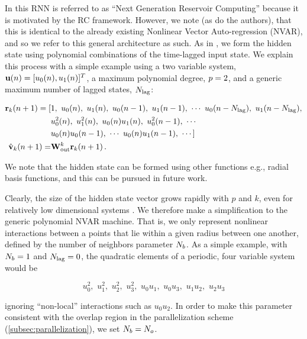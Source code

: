 In \citet{gauthier_next_2021} this RNN is referred to as ``Next Generation
Reservoir Computing'' because it is motivated by the RC framework.
However, we note (as do the authors), that this is identical to the already
existing Nonlinear Vector Auto-regression (NVAR), and so we refer to this general architecture as
such.
As in \citet{gauthier_next_2021,chen_next_2022}, we form the hidden state using
polynomial combinations of the time-lagged input state.
We explain this process with a simple example using a two variable system,
$\mathbf{u}(n) = [u_0(n), u_1(n)]^T$,
a maximum polynomial degree,
$p=2$, and a generic maximum number of lagged states, $N_\text{lag}$:
\begin{linenomath*}\begin{equation}
    \begin{aligned}
        \mathbf{r}_{k}(n+1)
        =
        [&1, \,\,
        u_0(n), \,\, u_1(n), \,\,
        u_0(n-1),\,\, u_1(n-1), \,\,
        \cdots \,\,
        u_0(n-N_\text{lag}), \,\, u_1(n-N_\text{lag}), \\
         &u_0^2(n), \,\, u_1^2(n), \,\, u_0(n)u_1(n), \,\,
        u_0^2(n-1), \,\, \cdots \\
         &u_0(n)u_0(n-1), \,\, \cdots \,\,
        u_0(n)u_1(n-1), \,\, \cdots
        ] \\
        \hat{\mathbf{v}}_{k}(n+1) = &\mathbf{W}_\text{out}^{k} \mathbf{r}_{k}(n+1) \, .
    \end{aligned}
\end{equation}\end{linenomath*}
We note that the hidden state can be formed using other functions e.g., radial
basis functions, and this can be pursued in future work.

Clearly, the size of the hidden state vector grows rapidly with $p$ and $k$,
even for relatively low dimensional systems
\citep<see supplemental material of>[for details]{chen_next_2022}.
We therefore make a simplification to the generic polynomial NVAR machine.
That is, we only represent nonlinear interactions between a points that lie
within a given radius between one another, defined by the number of neighbors parameter $N_{b}$.
As a simple example, with $N_{b}=1$ and $N_\text{lag}=0$, the quadratic elements of a periodic, four variable
system would be
\begin{linenomath*}\begin{equation*}
    u_0^2, \,\, u_1^2, \,\, u_2^2, \,\, u_3^2, \,\,
    u_0u_1, \,\, u_0u_3, \,\, u_1u_2, \,\, u_2u_3
\end{equation*}\end{linenomath*}
ignoring ``non-local'' interactions such as $u_0u_2$.
In order to make this parameter consistent with the overlap region in the
parallelization scheme (\cref{subsec:parallelization}),
we set $N_{b} = N_{o}$.

